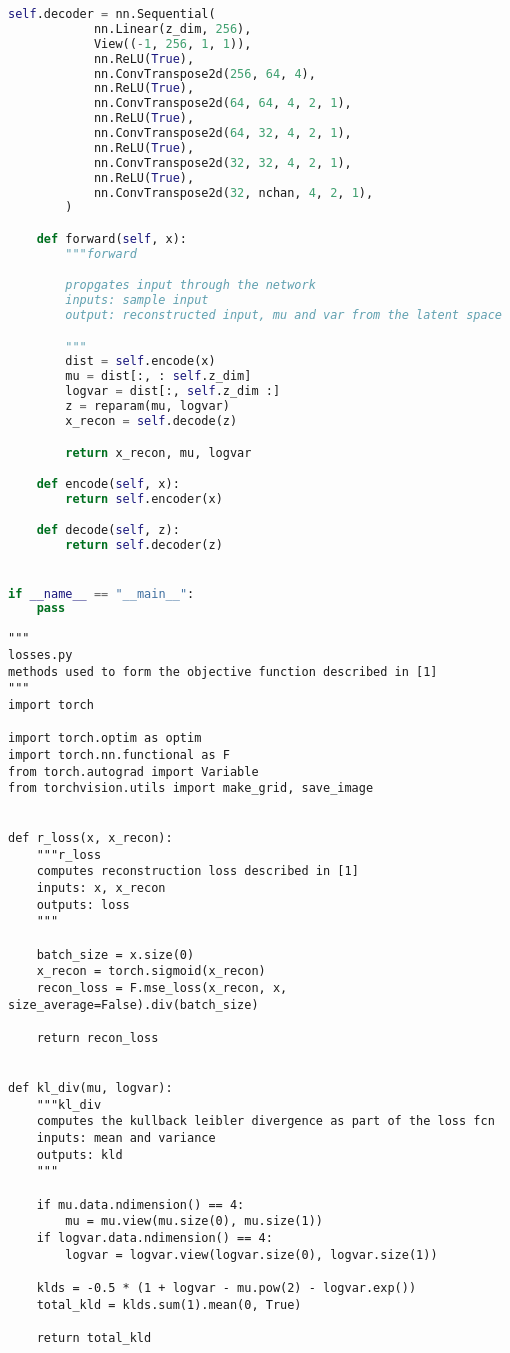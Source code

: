 \documentclass[justified,nobib]{tufte-handout}
\begin{document}
\begin{fullwidth}
\begin{lstlisting}[language=Python]
        self.decoder = nn.Sequential(
            nn.Linear(z_dim, 256),
            View((-1, 256, 1, 1)),
            nn.ReLU(True),
            nn.ConvTranspose2d(256, 64, 4),
            nn.ReLU(True),
            nn.ConvTranspose2d(64, 64, 4, 2, 1),
            nn.ReLU(True),
            nn.ConvTranspose2d(64, 32, 4, 2, 1),
            nn.ReLU(True),
            nn.ConvTranspose2d(32, 32, 4, 2, 1),
            nn.ReLU(True),
            nn.ConvTranspose2d(32, nchan, 4, 2, 1),
        )

    def forward(self, x):
        """forward

        propgates input through the network
        inputs: sample input
        output: reconstructed input, mu and var from the latent space

        """
        dist = self.encode(x)
        mu = dist[:, : self.z_dim]
        logvar = dist[:, self.z_dim :]
        z = reparam(mu, logvar)
        x_recon = self.decode(z)

        return x_recon, mu, logvar

    def encode(self, x):
        return self.encoder(x)

    def decode(self, z):
        return self.decoder(z)


if __name__ == "__main__":
    pass


\end{lstlisting}
\clearpage
\begin{lstlisting}
"""
losses.py
methods used to form the objective function described in [1]
"""
import torch

import torch.optim as optim
import torch.nn.functional as F
from torch.autograd import Variable
from torchvision.utils import make_grid, save_image


def r_loss(x, x_recon):
    """r_loss
    computes reconstruction loss described in [1]
    inputs: x, x_recon
    outputs: loss 
    """

    batch_size = x.size(0)
    x_recon = torch.sigmoid(x_recon)
    recon_loss = F.mse_loss(x_recon, x, size_average=False).div(batch_size)

    return recon_loss


def kl_div(mu, logvar):
    """kl_div
    computes the kullback leibler divergence as part of the loss fcn
    inputs: mean and variance
    outputs: kld
    """

    if mu.data.ndimension() == 4:
        mu = mu.view(mu.size(0), mu.size(1))
    if logvar.data.ndimension() == 4:
        logvar = logvar.view(logvar.size(0), logvar.size(1))

    klds = -0.5 * (1 + logvar - mu.pow(2) - logvar.exp())
    total_kld = klds.sum(1).mean(0, True)

    return total_kld
\end{lstlisting}

\end{fullwidth}
\end{document}
